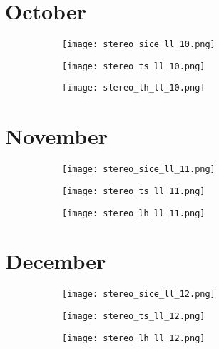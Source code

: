 \documentclass[preview]{standalone}
\begin{document}
\section*{October}
\begin{figure}
  \begin{subfigure}[t]{0.329\textwidth}
    \texttt{[image: stereo\_sice\_ll\_10.png]}
  \end{subfigure}
  \begin{subfigure}[t]{0.329\textwidth}
    \texttt{[image: stereo\_ts\_ll\_10.png]}
  \end{subfigure}
  \begin{subfigure}[t]{0.329\textwidth}
    \texttt{[image: stereo\_lh\_ll\_10.png]}
  \end{subfigure}
\end{figure}

\section*{November}
\begin{figure}
  \begin{subfigure}[t]{0.329\textwidth}
    \texttt{[image: stereo\_sice\_ll\_11.png]}
  \end{subfigure}
  \begin{subfigure}[t]{0.329\textwidth}
    \texttt{[image: stereo\_ts\_ll\_11.png]}
  \end{subfigure}
  \begin{subfigure}[t]{0.329\textwidth}
    \texttt{[image: stereo\_lh\_ll\_11.png]}
  \end{subfigure}
\end{figure}

\section*{December}
\begin{figure}
  \begin{subfigure}[t]{0.329\textwidth}
    \texttt{[image: stereo\_sice\_ll\_12.png]}
  \end{subfigure}
  \begin{subfigure}[t]{0.329\textwidth}
    \texttt{[image: stereo\_ts\_ll\_12.png]}
  \end{subfigure}
  \begin{subfigure}[t]{0.329\textwidth}
    \texttt{[image: stereo\_lh\_ll\_12.png]}
  \end{subfigure}
\end{figure}
\end{document}
